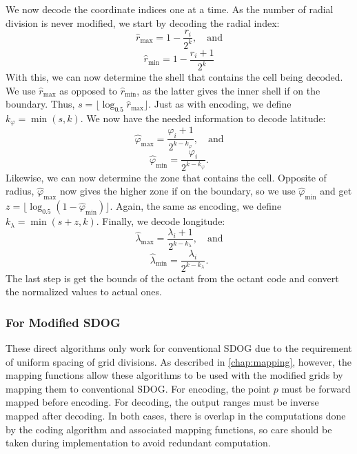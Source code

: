 We now decode the coordinate indices one at a time.
As the number of radial division is never modified, we start by decoding the radial index: 
%
\begin{equation*}
\hat{r}_\mathrm{max} = 1 - \frac{r_i}{2^k}, \quad \text{and}
\end{equation*}
%
\begin{equation*}
\hat{r}_\mathrm{min} = 1 - \frac{r_i + 1}{2^k}
\end{equation*}
%
With this, we can now determine the shell that contains the cell being decoded.
We use $\hat{r}_\mathrm{max}$ as opposed to $\hat{r}_\mathrm{min}$, as the latter gives the inner shell if on the boundary. Thus, $s = \lfloor \log_{0.5} \hat{r}_\mathrm{max} \rfloor$.
Just as with encoding, we define $k_\varphi = \min ( s, k )$.
We now have the needed information to decode latitude:
%
\begin{equation*}
\hat{\varphi}_\mathrm{max} = \frac{\varphi_i + 1}{2^{k - k_\varphi}}, \quad \text{and}
\end{equation*}
%
\begin{equation*}
\hat{\varphi}_\mathrm{min} = \frac{\varphi_i}{2^{k - k_\varphi}}.
\end{equation*}
%
Likewise, we can now determine the zone that contains the cell.
Opposite of radius, $\hat{\varphi}_\mathrm{max}$ now gives the higher zone if on the boundary, so we use $\hat{\varphi}_\mathrm{min}$ and get $z = \lfloor \log_{0.5} ( 1 - \hat{\varphi}_\mathrm{min} ) \rfloor$.
Again, the same as encoding, we define $k_\lambda = \min ( s + z, k )$.
Finally, we decode longitude:
%
\begin{equation*}
\hat{\lambda}_\mathrm{max} = \frac{\lambda_i + 1}{2^{k - k_\lambda}}, \quad \text{and}
\end{equation*}
%
\begin{equation*}
\hat{\lambda}_\mathrm{min} = \frac{\lambda_i}{2^{k - k_\lambda}}.
\end{equation*}
%
The last step is get the bounds of the octant from the octant code and convert the normalized values to actual ones.


\subsubsection{For Modified SDOG}
These direct algorithms only work for conventional SDOG due to the requirement of uniform spacing of grid divisions.
As described in \cref{chap:mapping}, however, the mapping functions allow these algorithms to be used with the modified grids by mapping them to conventional SDOG.
For encoding, the point $p$ must be forward mapped before encoding.
For decoding, the output ranges must be inverse mapped after decoding.
In both cases, there is overlap in the computations done by the coding algorithm and associated mapping functions, so care should be taken during implementation to avoid redundant computation.


